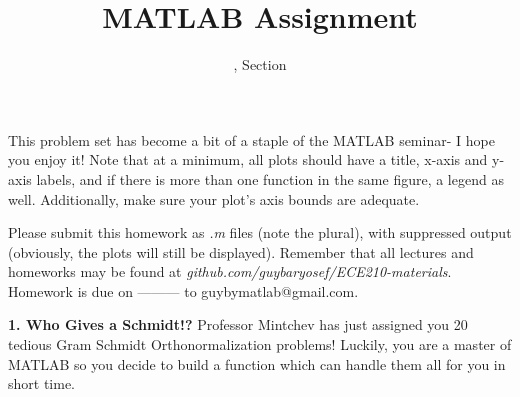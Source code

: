 \documentclass[11pt]{article}
\title{MATLAB Assignment \Homework}
\author{\Session, Section \Section}
\date{}
\makeatletter
\def\MyEmail{guybymatlab@gmail.com}
\def\DateOfSubmission{ --------- }
\makeatother
\begin{document}
\maketitle
This problem set has become a bit of a staple of the MATLAB seminar- I hope you enjoy it!
Note that at a minimum, all plots should have a title, x-axis and y-axis labels,
and if there is more than one function in the same figure, a legend as well.
Additionally, make sure your plot's axis bounds are adequate. 

Please submit this homework as \textit{.m} files (note the plural), 
with suppressed output (obviously, the plots will still be displayed).
Remember that all lectures and homeworks may be found at 
\textit{github.com/guybaryosef/ECE210-materials}.
Homework is due on \DateOfSubmission to \MyEmail.

\noindent
\newline
\textbf{1. Who Gives a Schmidt!?}
Professor Mintchev has just assigned you 20 tedious Gram Schmidt Orthonormalization problems!
Luckily, you are a master of MATLAB so you decide to build a function which can handle them all
for you in short time.
\end{document}
